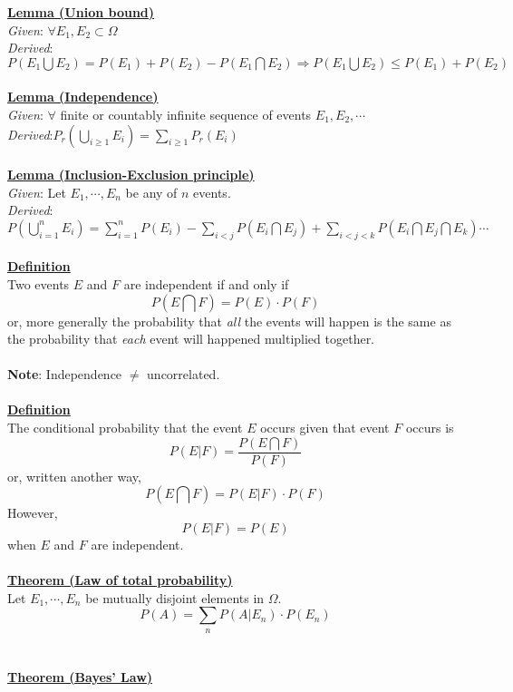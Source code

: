 \documentclass[12pt]{article}
\newcommand{\aside}[1]{\noindent\textbf{\underline{#1}}}
\begin{document}
\aside{Lemma (Union bound)} \\
\textit{Given}: $\forall E_1, E_2 \subset \Omega$
\\
\textit{Derived}: $P(E_1 \bigcup E_2) = P(E_1) + P(E_2) - P (E_1 \bigcap E_2) \Rightarrow P(E_1 \bigcup E_2) \le P(E_1) + P(E_2)$
\\ \\
\aside{Lemma (Independence)}  \\
\textit{Given}: $\forall$ finite or countably infinite sequence of events $E_1, E_2, \cdots$
\\
\textit{Derived}:$P_r(\bigcup\limits_{i \ge 1} E_{i}) = \sum\limits_{i \ge 1}P_r(E_i)$ 
\\ \\
\aside{Lemma (Inclusion-Exclusion principle)} \\
\textit{Given}: Let $E_1, \cdots, E_n$ be any of $n$ events.
\\
\textit{Derived}: $P(\bigcup \limits_{i=1}^{n} E_i) = \sum\limits_{i=1}^{n} P(E_i) - \sum\limits_{i < j} P(E_i \bigcap E_j) + \sum\limits_{i < j < k} P(E_i \bigcap E_j \bigcap E_k) \cdots$
\\ \\
\aside{Definition} \\
Two events $E$ and $F$ are independent if and only if \[P(E \bigcap F) = P(E) \cdot P(F)\] or, more generally the probability that \textit{all} the events will happen is the same as the probability that \textit{each} event will happened multiplied together.
\\ \\
\textbf{Note}: Independence $\neq$ uncorrelated.
\\ \\
\aside{Definition} \\
The conditional probability that the event $E$ occurs given that event $F$ occurs is \[P(E | F) = \frac{P(E \bigcap F)}{P(F)}\] or, written another way, \[P(E \bigcap F) = P(E | F) \cdot P(F)\]However, \[P(E | F) = P(E)\] when $E$ and $F$ are independent. \\ \\

\aside{Theorem (Law of total probability)} \\

Let $E_1, \cdots, E_n$ be mutually disjoint elements in $\Omega$. \[P(A) = \sum \limits_{n} P(A | E_n) \cdot P(E_n)\] \\ \\

\aside{Theorem (Bayes' Law)} \\
\end{document}
